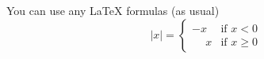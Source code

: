 You can use any LaTeX formulas (as usual)
\begin{equation}
|x| = \begin{cases}
		-x & \text{if }  x < 0  \\
		 \phantom{-}x & \text{if } x\ge 0
      \end{cases}	
	  \end{equation}
